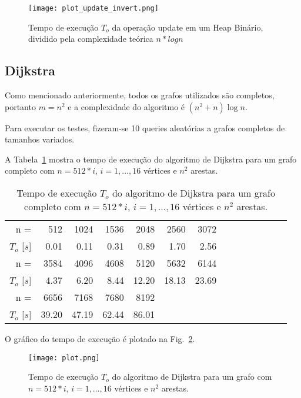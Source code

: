 \documentclass{article}
\begin{document}
\begin{figure}
  \centering
  \texttt{[image: plot\_update\_invert.png]}
  \caption{Tempo de execução $T_o$ da operação update em um Heap Binário, dividido pela complexidade teórica $n * log n$}
  \label{fig8}
\end{figure}

\subsection{Dijkstra}

Como mencionado anteriormente, todos os grafos utilizados são completos, portanto $m=n^2$ e a complexidade do algoritmo é $(n^2 + n) \log n$.

Para executar os testes, fizeram-se 10 queries aleatórias a grafos completos de tamanhos variados.

A Tabela~\ref{tab1} mostra o tempo de execução do algoritmo de Dijkstra para um grafo completo com $n=512 * i$, $i=1,\ldots,16$ vértices e $n ^ 2$ arestas.


\begin{table}
  \centering
  \begin{tabular}{rrrrrrrrrrrrrr}
    \hline
    n =             & 512  & 1024 & 1536 & 2048 & 2560 & 3072        \\
    $T_o$ [$s$]     & 0.01 & 0.11 & 0.31 & 0.89 & 1.70 & 2.56     \\
    \hline
    n =             & 3584 & 4096  & 4608 & 5120  & 5632  & 6144  \\
    $T_o$ [$s$]     & 4.37 & 6.20  & 8.44 & 12.20 & 18.13 & 23.69 \\
    \hline
    n =             & 6656  & 7168  & 7680  & 8192  \\
    $T_o$ [$s$]     & 39.20 & 47.19 & 62.44 & 86.01 \\
    \hline
  \end{tabular}
  \caption{Tempo de execução $T_o$ do algoritmo de Dijkstra para um grafo completo com $n=512 * i$, $i=1,\ldots,16$ vértices e $n ^ 2$ arestas.}
  \label{tab1}
\end{table}

O gráfico do tempo de execução é plotado na Fig.~\ref{fig1}.

\begin{figure}
  \centering
  \texttt{[image: plot.png]}
  \caption{Tempo de execução $T_o$ do algoritmo de Dijkstra para um grafo com $n=512 * i$, $i=1,\ldots,16$ vértices e $n ^ 2$ arestas.}
  \label{fig1}
\end{figure}
\end{document}
